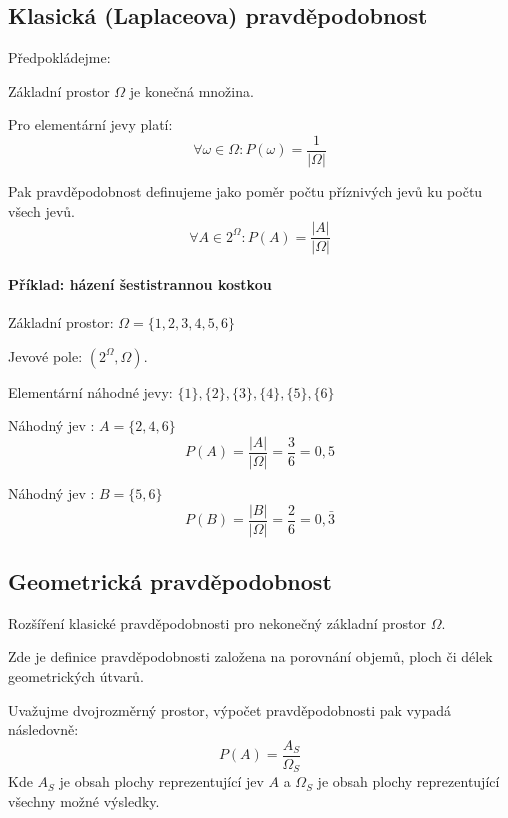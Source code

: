 \subsection{Klasická (Laplaceova) pravděpodobnost}

\begin{compactitem}
    \item Předpokládejme: \begin{compactitem}
        \item Základní prostor $\Omega$ je konečná množina.
        \item Pro elementární jevy platí:
        $$\forall \omega \in \Omega : P(\omega) = \frac{1}{|\Omega|}$$
    \end{compactitem}

    \item Pak pravděpodobnost definujeme jako poměr počtu příznivých jevů ku počtu všech jevů.
    $$ \forall A \in 2^{\Omega} : P(A) = \frac{|A|}{|\Omega|} $$
\end{compactitem}

\paragraph*{Příklad: házení šestistrannou kostkou}

\begin{compactitem}
    \item Základní prostor: $\Omega = \{ 1, 2, 3, 4, 5, 6 \}$
    \item Jevové pole: $(2^{\Omega}, \Omega)$.
    \item Elementární náhodné jevy: $ \{1\}, \{2\}, \{3\}, \{4\}, \{5\}, \{6\} $
    \item Náhodný jev : $A = \{ 2, 4, 6 \}$
    $$ P(A) = \frac{|A|}{|\Omega|} = \frac{3}{6} = 0,5 $$
    \item Náhodný jev : $B = \{ 5, 6 \}$
    $$ P(B) = \frac{|B|}{|\Omega|} = \frac{2}{6} = 0,\bar{3} $$
\end{compactitem}

\subsection{Geometrická pravděpodobnost}

\begin{compactitem}
    \item Rozšíření klasické pravděpodobnosti pro nekonečný základní prostor $\Omega$.

    \item Zde je definice pravděpodobnosti založena na porovnání objemů, ploch či délek geometrických útvarů.

    \item Uvažujme dvojrozměrný prostor, výpočet pravděpodobnosti pak vypadá následovně:
    $$ P(A) = \frac{A_S}{\Omega_S}$$
    Kde $A_S$ je obsah plochy reprezentující jev $A$ a $\Omega_S$ je obsah plochy reprezentující všechny možné výsledky.
\end{compactitem}

